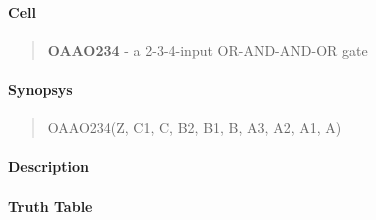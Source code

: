 \label{OAAO234}
\paragraph{Cell}
\begin{quote}
    \textbf{OAAO234} - a 2-3-4-input OR-AND-AND-OR gate
\end{quote}

\paragraph{Synopsys}
\begin{quote}
    OAAO234(Z, C1, C, B2, B1, B, A3, A2, A1, A)
\end{quote}

\paragraph{Description}

%

\paragraph{Truth Table}
%

